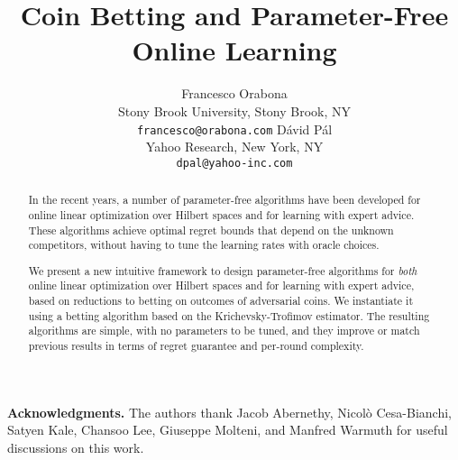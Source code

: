 \documentclass{article}
\author{
  Francesco Orabona\\
  Stony Brook University, Stony Brook, NY \\
  \texttt{francesco@orabona.com}
  \And
  D\'avid P\'al\\
  Yahoo Research, New York, NY\\
  \texttt{dpal@yahoo-inc.com}
}
\title{Coin Betting and Parameter-Free Online Learning}
\begin{document}
\maketitle

\begin{abstract}
In the recent years, a number of parameter-free algorithms have been developed
for online linear optimization over Hilbert spaces and for learning with expert
advice.  These algorithms achieve optimal regret bounds that depend on the
unknown competitors, without having to tune the learning rates with oracle
choices.

We present a new intuitive framework to design parameter-free algorithms for \emph{both} online linear optimization over Hilbert spaces and for learning with expert
advice, based on reductions to betting on outcomes of adversarial coins. We instantiate it
using a betting algorithm based on the Krichevsky-Trofimov estimator.  The
resulting algorithms are simple, with no parameters to be tuned, and they
improve or match previous results in terms of regret guarantee and per-round
complexity.
\end{abstract}

\vspace{-0.2cm}











\textbf{Acknowledgments.} The authors thank Jacob Abernethy, Nicol\`{o}
Cesa-Bianchi, Satyen Kale, Chansoo Lee, Giuseppe Molteni, and Manfred Warmuth for useful
discussions on this work.

\vspace{-0.38cm}

\begin{small}
\setlength{\bibsep}{2pt}


\end{small}

\appendix






\end{document}
